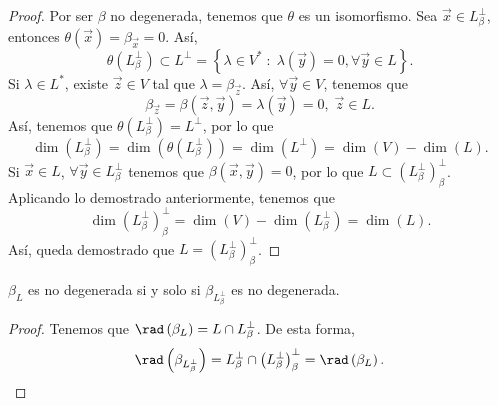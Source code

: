 \begin{proof}
Por ser $\displaystyle \beta  $ no degenerada, tenemos que $\displaystyle \theta  $ es un isomorfismo. Sea $\displaystyle \vec{x} \in L^{\perp }_{\beta } $, entonces $\displaystyle \theta\left(\vec{x}\right) = \beta_{\vec{x}} = 0 $. Así, 
\[ \theta\left(L^{\perp }_{\beta }\right) \subset L^{\perp } = \left\{ \lambda \in V^{*} \; : \; \lambda\left(\vec{y}\right) = 0, \forall \vec{y} \in L\right\}  .\]
Si $\displaystyle \lambda \in L^{*} $, existe $\displaystyle \vec{z} \in V $ tal que $\displaystyle \lambda = \beta_{\vec{z}} $. Así, $\displaystyle \forall \vec{y}\in V $, tenemos que 
\[ \beta_{\vec{z}} = \beta\left(\vec{z}, \vec{y}\right) = \lambda\left(\vec{y}\right) = 0, \; \vec{z} \in L.\]
Así, tenemos que $\displaystyle \theta\left(L^{\perp }_{\beta }\right) = L^{\perp } $, por lo que 
\[\dim\left(L^{\perp }_{\beta }\right) = \dim\left(\theta\left(L^{\perp }_{\beta }\right)\right) = \dim\left(L^{\perp }\right) = \dim\left(V\right)-\dim\left(L\right) .\]
Si $\displaystyle \vec{x} \in L $, $\displaystyle \forall \vec{y} \in L^{\perp }_{\beta } $ tenemos que $\displaystyle \beta\left(\vec{x}, \vec{y}\right) = 0 $, por lo que $\displaystyle L \subset \left(L^{\perp }_{\beta }\right)^{\perp }_{\beta } $. Aplicando lo demostrado anteriormente, tenemos que
\[\dim\left(L^{\perp }_{\beta }\right)^{\perp }_{\beta } = \dim\left(V\right) - \dim\left(L^{\perp }_{\beta}\right) = \dim \left(L\right) .\]
Así, queda demostrado que $\displaystyle L = \left(L^{\perp }_{\beta }\right)^{\perp }_{\beta } $.
\end{proof}
\begin{fcolorary}[]
\normalfont $\displaystyle \beta_{L} $ es no degenerada si y solo si $\displaystyle \beta _{L^{\perp }_{\beta }} $ es no degenerada.
\end{fcolorary}
\begin{proof}
Tenemos que $\displaystyle \rad\left(\beta_{L}\right) = L\cap L^{\perp }_{\beta } $. De esta forma,
\[ \rad\left(\beta _{L^{\perp }_{\beta }}\right) = L^{\perp }_{\beta }\cap\left(L^{\perp }_{\beta }\right)^{\perp }_{\beta } = \rad\left(\beta_{L}\right) .\]
\end{proof}
